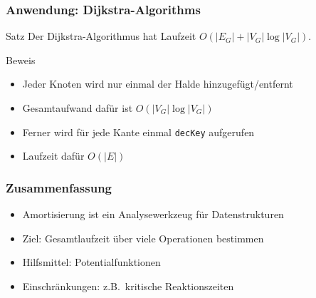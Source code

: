 \documentclass[aspectratio=1610, 11pt]{beamer}
\begin{document}

\begin{frame}\frametitle{Anwendung: Dijkstra-Algorithms}
	\begin{block}{Satz}
		Der Dijkstra-Algorithmus hat Laufzeit $O(|E_G|+|V_G|\log|V_G|)$. 
	\end{block}
	\begin{overprint}
		\begin{exampleblock}{Beweis}
			\begin{itemize}
				\item Jeder Knoten wird nur einmal der Halde hinzugef\"ugt/entfernt
				\item Gesamtaufwand daf\"ur ist $O(|V_G|\log|V_G|)$
				\item Ferner wird f\"ur jede Kante einmal {\tt decKey} aufgerufen
				\item Laufzeit daf\"ur $O(|E|)$
			\end{itemize}
		\end{exampleblock}
	\end{overprint}
\end{frame}

\begin{frame}\frametitle{Zusammenfassung}
	\begin{exampleblock}{}
		\begin{itemize}
			\item Amortisierung ist ein Analysewerkzeug f\"ur Datenstrukturen 
			\item \alert{Ziel:} Gesamtlaufzeit \"uber viele Operationen bestimmen
			\item \alert{Hilfsmittel:} Potentialfunktionen
			\item \alert{Einschr\"ankungen:} z.B.\ kritische Reaktionszeiten
		\end{itemize}
	\end{exampleblock}
\end{frame}
\end{document}
